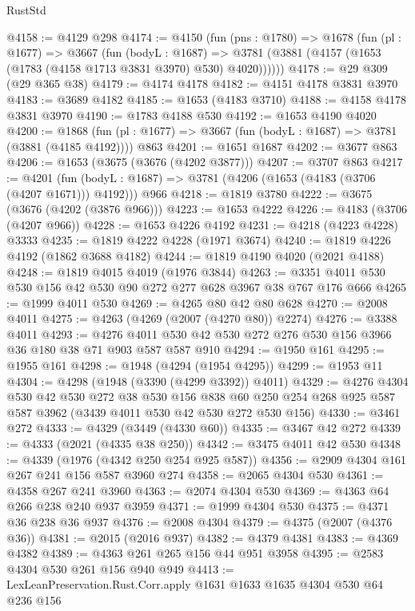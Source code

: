 \begin{lexlean}{RustStd}
\begin{coremodule}
@4158 := @4129 @298
@4174 := @4150
    (fun (pns : @1780) =>
    @1678
      (fun (pl : @1677) =>
      @3667
        (fun (bodyL : @1687) =>
        @3781 (@3881 (@4157 (@1653 (@1783 (@4158 @1713 @3831 @3970) @530) @4020))))))
@4178 := @29 @309 (@29 @365 @38)
@4179 := @4174 @4178
@4182 := @4151 @4178 @3831 @3970
@4183 := @3689 @4182
@4185 := @1653 (@4183 @3710)
@4188 := @4158 @4178 @3831 @3970
@4190 := @1783 @4188 @530
@4192 := @1653 @4190 @4020
@4200 := @1868 (fun (pl : @1677) => @3667 (fun (bodyL : @1687) => @3781 (@3881 (@4185 @4192)))) @863
@4201 := @1651 @1687
@4202 := @3677 @863
@4206 := @1653 (@3675 (@3676 (@4202 @3877)))
@4207 := @3707 @863
@4217 := @4201
    (fun (bodyL : @1687) => @3781 (@4206 (@1653 (@4183 (@3706 (@4207 @1671))) @4192)))
    @966
@4218 := @1819 @3780
@4222 := @3675 (@3676 (@4202 (@3876 @966)))
@4223 := @1653 @4222
@4226 := @4183 (@3706 (@4207 @966))
@4228 := @1653 @4226 @4192
@4231 := @4218 (@4223 @4228) @3333
@4235 := @1819 @4222 @4228 (@1971 @3674)
@4240 := @1819 @4226 @4192 (@1862 @3688 @4182)
@4244 := @1819 @4190 @4020 (@2021 @4188)
@4248 := @1819 @4015 @4019 (@1976 @3844)
@4263 := @3351 @4011 @530 @530 @156 @42 @530 @90 @272 @277 @628 @3967 @38 @767 @176 @666
@4265 := @1999 @4011 @530
@4269 := @4265 @80 @42 @80 @628
@4270 := @2008 @4011
@4275 := @4263 (@4269 (@2007 (@4270 @80)) @2274)
@4276 := @3388 @4011
@4293 := @4276 @4011 @530 @42 @530 @272 @276 @530 @156 @3966 @36 @180 @38 @71 @903 @587 @587 @910
@4294 := @1950 @161
@4295 := @1955 @161
@4298 := @1948 (@4294 (@1954 @4295))
@4299 := @1953 @11
@4304 := @4298 (@1948 (@3390 (@4299 @3392)) @4011)
@4329 := @4276
    @4304
    @530
    @42
    @530
    @272
    @38
    @530
    @156
    @838
    @60
    @250
    @254
    @268
    @925
    @587
    @587
    @3962
    (@3439 @4011 @530 @42 @530 @272 @530 @156)
@4330 := @3461 @272
@4333 := @4329 (@3449 (@4330 @60))
@4335 := @3467 @42 @272
@4339 := @4333 (@2021 (@4335 @38 @250))
@4342 := @3475 @4011 @42 @530
@4348 := @4339 (@1976 (@4342 @250 @254 @925 @587))
@4356 := @2909 @4304 @161 @267 @241 @156 @587 @3960 @274
@4358 := @2065 @4304 @530
@4361 := @4358 @267 @241 @3960
@4363 := @2074 @4304 @530
@4369 := @4363 @64 @266 @238 @240 @937 @3959
@4371 := @1999 @4304 @530
@4375 := @4371 @36 @238 @36 @937
@4376 := @2008 @4304
@4379 := @4375 (@2007 (@4376 @36))
@4381 := @2015 (@2016 @937)
@4382 := @4379 @4381
@4383 := @4369 @4382
@4389 := @4363 @261 @265 @156 @44 @951 @3958
@4395 := @2583 @4304 @530 @261 @156 @940 @949
@4413 := LexLeanPreservation.Rust.Corr.apply
    @1631
    @1633
    @1635
    @4304
    @530
    @64
    @236
    @156

\end{coremodule}
\end{lexlean}
